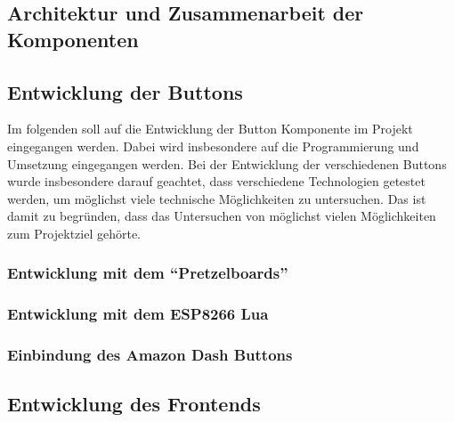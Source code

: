 

\subsection{Architektur und Zusammenarbeit der Komponenten}        
\label{sec:Architektur und Zusammenarbeit der Komponenten-1} 



\newpage

\subsection{Entwicklung der Buttons}  
\label{sec:Entwicklung der Buttons-1} 

Im folgenden soll auf die Entwicklung der Button Komponente im Projekt eingegangen werden. Dabei wird insbesondere auf die Programmierung und Umsetzung eingegangen werden. 
Bei der Entwicklung der verschiedenen Buttons wurde insbesondere darauf geachtet, dass verschiedene Technologien getestet werden, um möglichst viele technische Möglichkeiten zu untersuchen. Das ist damit zu begründen, dass das Untersuchen von möglichst vielen Möglichkeiten zum Projektziel gehörte. 

\subsubsection{Entwicklung mit dem ``Pretzelboards''}  
\label{sec:Entwicklung mit dem ``Pretzelboards''-1}


\subsubsection{Entwicklung mit dem ESP8266 Lua}  
\label{sec:Entwicklung mit dem ESP8266-1}


\subsubsection{Einbindung des Amazon Dash Buttons}  
\label{sec:Einbindung des Amazon Dash Buttons-1}


\newpage

\subsection{Entwicklung des Frontends}  
\label{sec:Entwicklung der Frontends-1} 

